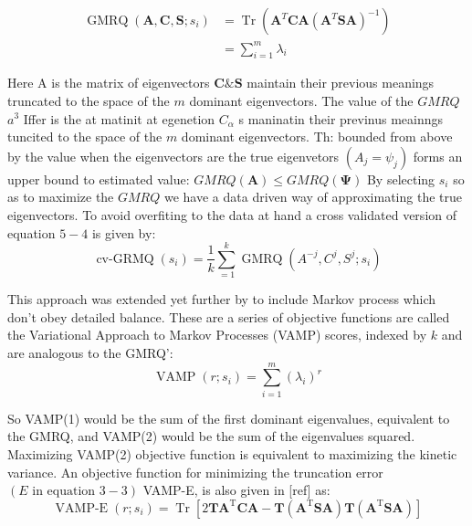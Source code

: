 \begin{equation}
\begin{split}
\operatorname{GMRQ}\left(\mathbf{A}, \mathbf{C}, \mathbf{S} ; s_{i}\right) &=\operatorname{Tr}\left(\mathbf{A}^{T} \mathbf{C A}\left(\mathbf{A}^{T} \mathbf{S} \mathbf{A}\right)^{-1}\right) \\
&=\sum_{i=1}^{m} \lambda_{i}
\end{split}
\end{equation}

Here A is the matrix of eigenvectors $\mathbf{C} \& \mathbf{S}$ maintain their previous meanings truncated to the space of the $m$ dominant eigenvectors. The value of the $G M R Q$ $a^{3}$
Iffer is the at matinit at egenetion $C_{\alpha}$ s maninatin their previnus meainngs tuncited to the space of the $m$ dominant eigenvectors. Th: bounded from above by the value when the eigenvectors are the true eigenvetors $\left(A_{j}=\psi_{j}\right)$ forms an upper bound to estimated value:
$G M R Q(\mathbf{A}) \leq G M R Q(\boldsymbol{\Psi})$
By selecting $s_{i}$ so as to maximize the $G M R Q$ we have a data driven way of approximating the true eigenvectors. To avoid overfiting to the data at hand a cross validated version of equation $5-4$ is given by:
\begin{equation}
\operatorname{cv-GRMQ}(s_{i})=\frac{1}{k} \sum_{=1}^{k} \operatorname{GMRQ}\left(A^{-j}, C^{j}, S^{j} ; s_{i}\right)
\end{equation}

This approach was extended yet further by to include Markov process which don't obey detailed balance. These are a series of objective functions are called the Variational Approach to Markov Processes (VAMP) scores, indexed by $k$ and are analogous to the GMRQ':
\begin{equation}\label{eqn:def_vampr}
\operatorname{VAMP}(r ; s_{i})=\sum_{i=1}^{m}\left(\lambda_{i}\right)^{r}
\end{equation}

So VAMP(1) would be the sum of the first dominant eigenvalues, equivalent to the GMRQ, and VAMP(2) would be the sum of the eigenvalues squared. Maximizing VAMP(2) objective function is equivalent to maximizing the kinetic variance. An objective function for minimizing the truncation error $(E \text { in equation } 3-3)$ VAMP-E, is also given in [ref] as:
\begin{equation}
\operatorname{V A M P-E}(r; s_{i})=\operatorname{Tr}\left[2 \mathbf{T} \mathbf{A}^{\mathrm{T}} \mathbf{C A}-\mathbf{T}\left(\mathbf{A}^{\mathrm{T}} \mathbf{S} \mathbf{A}\right) \mathbf{T}\left(\mathbf{A}^{\mathrm{T}} \mathbf{S} \mathbf{A}\right)\right]
\end{equation}

